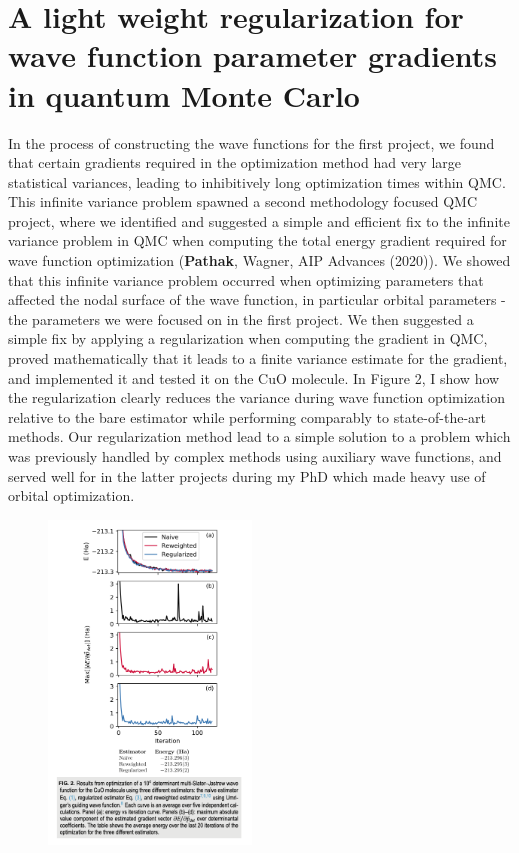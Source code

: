 \documentclass{article}
\begin{document}
\section{A light weight regularization for wave function parameter gradients in quantum Monte Carlo}
In the process of constructing the wave functions for the first project, we found that certain gradients required in the optimization method had very large statistical variances,  leading to inhibitively long optimization times within QMC.
This infinite variance problem spawned a second methodology focused QMC project, where we identified and suggested a simple and efficient fix to the infinite variance problem in QMC when computing the total energy gradient required for wave function optimization (\textbf{Pathak}, Wagner, AIP Advances (2020)).
We showed that this infinite variance problem occurred when optimizing parameters that affected the nodal surface of the wave function, in particular orbital parameters - the parameters we were focused on in the first project.
We then suggested a simple fix by applying a regularization when computing the gradient in QMC,  proved mathematically that it leads to a finite variance estimate for the gradient, and implemented it and tested it on the CuO molecule.
In Figure 2, I show how the regularization clearly reduces the variance during wave function optimization relative to the bare estimator while performing comparably to state-of-the-art methods.
Our regularization method lead to a simple solution to a problem which was previously handled by complex methods using auxiliary wave functions, and served well for in the latter projects during my PhD which made heavy use of orbital optimization.
\begin{figure}
	\includegraphics[width=0.48\textwidth]{pgrad.png}
\end{figure}
\end{document}
